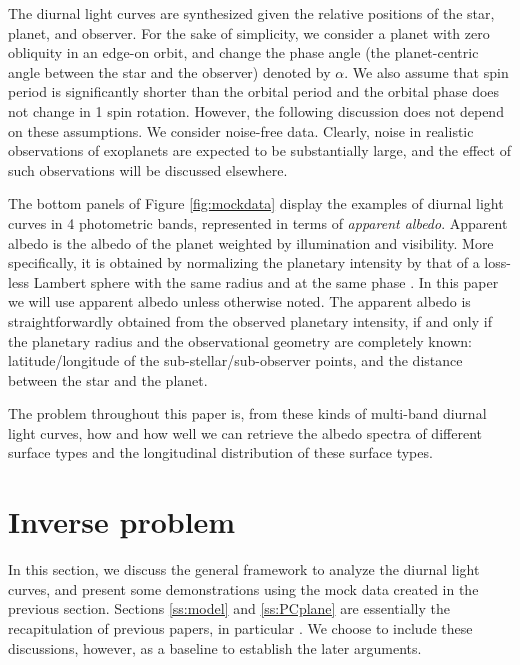 \documentclass[iop,numberedappendix,apj,]{emulateapj}
\def\memoJLY#1{\color{green}[JLY: {\bf #1}]\color{black}}
\begin{document}

{\color{red} 
The diurnal light curves are synthesized given the relative positions of the star, planet, and observer. 
For the sake of simplicity, we consider a planet with zero obliquity in an edge-on orbit, and change the phase angle (the planet-centric angle between the star and the observer) denoted by $\alpha $. 
We also assume that spin period is significantly shorter than the orbital period and the orbital phase does not change in 1 spin rotation. 
However, the following discussion does not depend on these assumptions. 
We consider noise-free data. Clearly, noise in realistic observations of exoplanets are expected to be substantially large, and the effect of such observations will be discussed elsewhere.}
\color{black}

The bottom panels of Figure \ref{fig:mockdata} display the examples of diurnal light curves in 4 photometric bands, represented in terms of {\it apparent albedo}. 
Apparent albedo is the albedo of the planet weighted by illumination and visibility. 
More specifically, it is obtained by normalizing the planetary intensity by that of a loss-less Lambert sphere with the same radius and at the same phase \citep{Qiu2003, Seager2010}. 
In this paper we will use apparent albedo unless otherwise noted. 
The apparent albedo is straightforwardly obtained from the observed planetary intensity, if and only if the planetary radius and the observational geometry are completely known: latitude/longitude of the sub-stellar/sub-observer points, and the distance between the star and the planet. 

The problem throughout this paper is, from these kinds of multi-band diurnal light curves, how and how well we can retrieve the albedo spectra of different surface types and the longitudinal distribution of these surface types. 


\section{Inverse problem}
\label{s:frame}

In this section, we discuss the general framework to analyze the diurnal light curves, and present some demonstrations using the mock data created in the previous section. 
Sections \ref{ss:model} and \ref{ss:PCplane} are essentially the recapitulation of previous papers, in particular \citet{Cowan2013} \citep[but see also][]{Cowan2009,Cowan2011,Fujii2010,Fujii2011}.  
We choose to include these discussions, however, as a baseline to establish the later arguments. 
\end{document}
